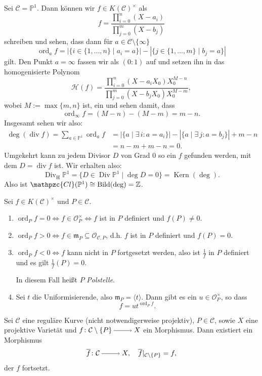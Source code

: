 \documentclass[a4paper,12pt]{scrbook}
\theoremstyle{keinenummern} %
\theoremstyle{mitnummern}
\theoremstyle{unserbeweis}
\def\CC{\mathcal{C}}
\def\O{\mathcal{O}}
\def\P{\mathbb{P}}
\renewcommand{\H}{\mathcal{H}} %
\newcommand{\Cl}{\mathpzc{Cl}}
\def\m{\mathfrak{m}}
\newcommand{\Kern}{\operatorname{Kern}}
\newcommand{\Bild}{\operatorname{Bild}}
\newcommand{\Div}{\operatorname{Div}}
\newcommand{\Divh}{\Div_{\mathrm{H}}}
\renewcommand{\div}{\operatorname{div}}
\newcommand{\ord}{\operatorname{ord}}
\newcommand{\card}[1]{|#1|}
\newcommand{\restrict}[1]{|_{#1}}
\renewcommand{\dotsc}{\ensuremath{\!...}}
\newcommand{\set}[1]{\ensuremath{\mathbb{#1}}}
\newcommand{\Z}{\set{Z}}
\newcommand{\ra}{\raisebox{-1pt}{\tikz{\draw[thin,shorten >=3pt, ->] (0,0) node{\hspace*{-2pt}} -- node{} (1,0);}}\penalty1000\relax}
\def\Bar#1{\ensuremath\overline{#1}}
\begin{document}
\begin{bsp}\label{4.1.4}
Sei $\CC=\P^{1}$. Dann können wir $f\in K(\CC)^{\times}$ als
\[f=\frac{\displaystyle\prod_{i=0}^{n}(X-a_{i})}{\displaystyle\prod_{j=0}^{m}(X-b_{j})}\]
schreiben und sehen, dass dann für $a\in\CC\setminus\{\infty\}$
\[\ord_{a}f=\card{\{i\in\{1,\dotsc,n\}\mid a_{i}=a\}}-\card{\{j\in\{1,\dotsc,m\}\mid b_{j}=a\}}\]
gilt. Den Punkt $a=\infty$ fassen wir als $(0:1)$ auf und setzen ihn in das homogenisierte Polynom
\[\H(f)=\frac{\displaystyle\prod_{i=0}^{n}(X-a_{i}X_{0})X_{0}^{M-n}}{\displaystyle\prod_{j=0}^{m}(X-b_{j}X_{0})X_{0}^{M-m}},\]
wobei $M:=\max\{m,n\}$ ist, ein und sehen damit, dass
\[\ord_{\infty}f=(M-n)-(M-m)=m-n.\]
Insgesamt sehen wir also:
\begin{align*}
\deg(\div f)=\sum_{a\in\P^{1}}\ord_{a}f&=\card{\{a\mid \exists\, i: a=a_{i}\}}-\card{\{a\mid \exists\, j: a=b_{j}\}}+m-n\\
&=n-m+m-n=0.
\end{align*}
Umgekehrt kann zu jedem Divisor $D$ von Grad $0$ so ein $f$ gefunden werden, mit dem $D=\div f$ ist. Wir erhalten also:
\[\Divh\P^{1}=\{D\in\Div\P^{1}\mid\deg D=0\}=\Kern(\deg).\]
Also ist $\Cl(\P^{1})\cong\Bild(\deg)=\Z$.
\end{bsp}

\begin{db}\label{4.1.5}
Sei $f\in K(\CC)^{\times}$ und $P\in\CC$.
\begin{enumerate}
\item $\ord_{P}f = 0\iff f\in\O_{P}^{\times}\iff f$ ist in $P$ definiert und $f(P)\neq 0$.
\item $\ord_{P}f>0\iff f\in\m_{P}\subseteq\O_{\CC,P}$, d.h. $f$ ist in $P$ definiert und $f(P)=0$.
\item \mbox{$\ord_{P}f<0 \iff f$} kann nicht in $P$ fortgesetzt werden, also ist $\frac{1}{f}$ in $P$ definiert und es gilt $\frac{1}{f}(P)=0$.

In diesem Fall heißt $P$ \emph{Polstelle}.
\item Sei $t$ die Uniformisierende, also $\m_{P}=\langle t\rangle$. Dann gibt es ein $u\in\O_{P}^{\times}$, so dass
\[f=ut^{\ord_{P}f}.\]
\end{enumerate}\end{db}

\begin{prop}\label{4.1.6}
Sei $\CC$ eine reguläre Kurve (nicht notwendigerweise projektiv), $P\in\CC$, sowie $X$ eine projektive Varietät und $f\colon \CC\setminus\{P\}\ra X$ ein Morphismus. Dann existiert ein Morphismus
\[\Bar{f}\colon \CC\ra X,\quad \Bar{f}\restrict{\CC\setminus\{P\}}=f,\]
der $f$ fortsetzt.
\end{prop}
\end{document}
